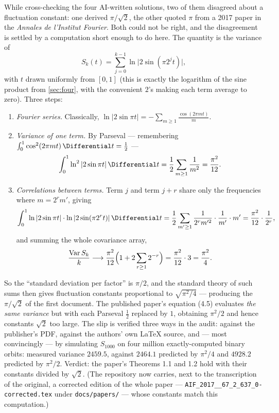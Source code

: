 \documentclass[11pt,oneside]{article}
\theoremstyle{remark}
\begin{document}
While cross-checking the four AI-written solutions, two of them
disagreed about a fluctuation constant: one derived
$\pi/\sqrt2$, the other quoted $\pi$ from a 2017 paper in the
\emph{Annales de l'Institut Fourier}.  Both could not be right, and
the disagreement is settled by a computation short enough to do here.
The quantity is the variance of
\[
 S_k(t)=\sum_{j=0}^{k-1}\ln\bigl|2\sin(\pi 2^jt)\bigr| ,
\]
with $t$ drawn uniformly from $[0,1]$ (this is exactly the logarithm
of the sine product from \cref{sec:four}, with the convenient
$2$'s making each term average to zero).  Three steps:

\begin{enumerate}
\item \emph{Fourier series.}  Classically,
$\ln|2\sin\pi t|=-\sum_{m\ge1}\frac{\cos(2\pi mt)}{m}$.
\item \emph{Variance of one term.}  By Parseval --- remembering
$\int_0^1\cos^2(2\pi mt)\,\Differential t=\tfrac12$ ---
\[
 \int_0^1\ln^2|2\sin\pi t|\,\Differential t
 =\frac12\sum_{m\ge1}\frac1{m^2}
 =\frac{\pi^2}{12}.
\]
\item \emph{Correlations between terms.}  Term $j$ and term $j+r$
share only the frequencies where $m=2^r m'$, giving
\[
 \int_0^1\ln|2\sin\pi t|\cdot\ln|2\sin(\pi 2^rt)|\,\Differential t
 =\frac12\sum_{m'\ge1}\frac{1}{2^rm'^2}\cdot\frac1{m'}\cdot m'
 =\frac{\pi^2}{12}\cdot\frac{1}{2^r},
\]
and summing the whole covariance array,
\[
 \frac{\operatorname{Var}S_k}{k}\longrightarrow
 \frac{\pi^2}{12}\Bigl(1+2\sum_{r\ge1}2^{-r}\Bigr)
 =\frac{\pi^2}{12}\cdot3
 =\frac{\pi^2}{4}.
\]
\end{enumerate}
So the ``standard deviation per factor'' is $\pi/2$, and the standard
theory of such sums then gives fluctuation constants proportional to
$\sqrt{\pi^2/4}$ --- producing the $\pi/\sqrt2$ of the first document.
The published paper's equation (4.5) evaluates \emph{the same
variance} but with each Parseval $\tfrac12$ replaced by $1$, obtaining
$\pi^2/2$ and hence constants $\sqrt2$ too large.  The slip is
verified three ways in the audit: against the publisher's PDF, against
the authors' own \LaTeX{} source, and --- most convincingly --- by
simulating $S_{1000}$ on four million exactly-computed binary orbits:
measured variance $2459.5$, against $2464.1$ predicted by
$\pi^2/4$ and $4928.2$ predicted by $\pi^2/2$.  Verdict: the paper's
Theorems 1.1 and 1.2 hold with their constants divided by $\sqrt2$.
(The repository now carries, next to the transcription of the original,
a corrected edition of the whole paper ---
\nolinkurl{AIF_2017__67_2_637_0-corrected.tex} under
\nolinkurl{docs/papers/} --- whose constants match this computation.)
\end{document}
